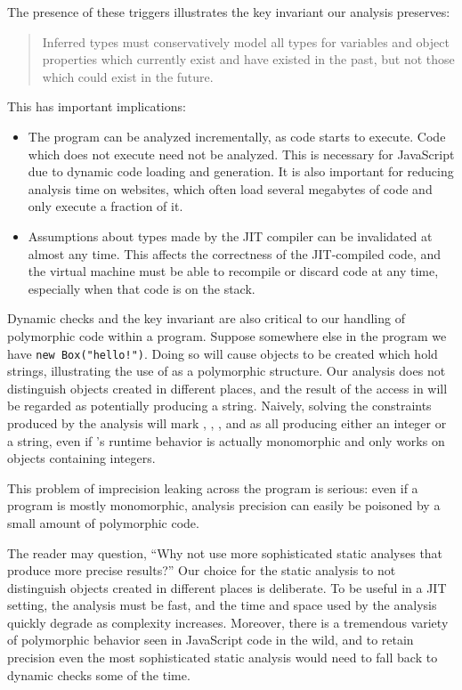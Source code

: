 The presence of these triggers illustrates the key invariant our analysis
preserves:
\begin{quote}
Inferred types must conservatively model all types for
variables and object properties which currently exist and have existed
in the past, but not those
which could exist in the future.
\end{quote}
This has important implications:

\begin{itemize}

\item The program can be analyzed incrementally, as code starts to execute.
Code which does not execute need not be analyzed.
This is necessary for JavaScript due to dynamic code loading
and generation. It is also important for reducing
analysis time on websites, which often load several megabytes of
code and only execute a fraction of it.

\item Assumptions about types made by the JIT compiler can be invalidated
at almost any time.
This affects the correctness of the JIT-compiled code, and the virtual machine
must be able to recompile or discard code at any time,
especially when that code is on the stack.

\end{itemize}

Dynamic checks and the key invariant are also critical to our handling of polymorphic code
within a program. Suppose somewhere else in the program we have
\lstinline{new Box("hello!")}.
Doing so will cause  objects
to be created which hold strings,
illustrating the use of  as a polymorphic structure.
Our analysis does not distinguish  objects created in different
places, and the result of the  access in  will
be regarded as potentially producing a string.
Naively, solving the constraints produced by the analysis will mark
, , , and  as all producing
either an integer or a string, even if 's runtime behavior is actually monomorphic
and only works on  objects containing integers.

This problem of imprecision leaking across the program is serious: even
if a program is mostly monomorphic, analysis precision can
easily be poisoned by a small amount of polymorphic code.

The reader may question, ``Why not use more sophisticated static analyses that
produce more precise results?''
Our choice for the static analysis to not distinguish  objects
created in different places is deliberate.
To be useful in a JIT setting, the analysis must be fast, and the time
and space used by the analysis quickly degrade as complexity increases.
Moreover, there is a tremendous variety of polymorphic behavior seen in
JavaScript code in the wild, and to retain precision even the
most sophisticated static analysis would need to fall back to dynamic
checks some of the time.

